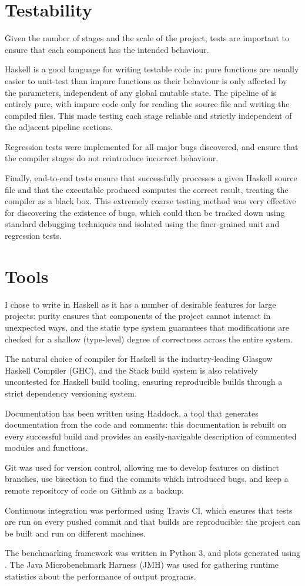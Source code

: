 \documentclass[dissertation.tex]{subfiles}
\begin{document}
\section{Testability}
{
    Given the number of stages and the scale of the project, tests are important to ensure that each component has the intended behaviour.
    
    Haskell is a good language for writing testable code in: pure functions are usually easier to unit-test than impure functions as their behaviour is only affected by the parameters, independent of any global mutable state. The pipeline of \compilername is entirely pure, with impure code only for reading the source file and writing the compiled files. This made testing each stage reliable and strictly independent of the adjacent pipeline sections.

    Regression tests were implemented for all major bugs discovered, and ensure that the compiler stages do not reintroduce incorrect behaviour. 

    Finally, end-to-end tests ensure that \compilername successfully processes a given Haskell source file and that the executable produced computes the correct result, treating the compiler as a black box. This extremely coarse testing method was very effective for discovering the existence of bugs, which could then be tracked down using standard debugging techniques and isolated using the finer-grained unit and regression tests. 
}
\section{Tools}
{
    I chose to write \compilername in Haskell as it has a number of desirable features for large projects: purity ensures that components of the project cannot interact in unexpected ways, and the static type system guarantees that modifications are checked for a shallow (type-level) degree of correctness across the entire system.

    The natural choice of compiler for Haskell is the industry-leading Glasgow Haskell Compiler (GHC), and the Stack build system is also relatively uncontested for Haskell build tooling, ensuring reproducible builds through a strict dependency versioning system.

    Documentation has been written using Haddock, a tool that generates documentation from the code and comments: this documentation is rebuilt on every successful build and provides an easily-navigable description of commented modules and functions.

    Git was used for version control, allowing me to develop features on distinct branches, use bisection to find the commits which introduced bugs, and keep a remote repository of code on Github as a backup. 

    Continuous integration was performed using Travis CI, which ensures that tests are run on every pushed commit and that builds are reproducible: the project can be built and run on different machines.

    The benchmarking framework was written in Python 3, and plots generated using . The Java Microbenchmark Harness (JMH) was used for gathering runtime statistics about the performance of output programs. 
}
\end{document}
